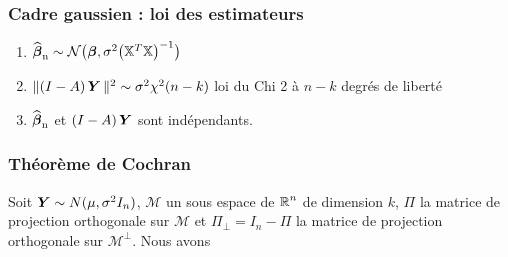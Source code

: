 
\begin{frame}
\frametitle{Cadre gaussien : loi des estimateurs}
\begin{prop}
\begin{enumerate}
\item  $\operatorname{\widehat{\boldsymbol{\beta}}_n} \sim {\mathcal N}\big(\boldsymbol{\beta}, \sigma^2 \big(\mathbb{X}^T\mathbb{X}\big)^{-1}\big)$
\item  $\|(I - A) \operatorname{\boldsymbol{Y}} \|^2 \sim
\sigma^2\chi^2(n-k)$ \alert{ loi du Chi 2 à $n-k$ degrés de liberté}
\item  $\operatorname{\widehat{\boldsymbol{\beta}}_n}$ et $(I - A) \operatorname{\boldsymbol{Y}}$ sont indépendants.
\end{enumerate}
\end{prop}
\end{frame}

\begin{frame}
\frametitle{Théorème de Cochran}
\begin{theo}
Soit $\operatorname{\boldsymbol{Y}} \sim N(\mu,\sigma^2 I_n)$, $\mathcal{M}$ un sous espace de $\operatorname{{\mathbb R}}^n$ de dimension $k$, $\Pi$ la matrice de projection orthogonale 
sur $\mathcal{M}$ et $\Pi_{\perp}= I_n - \Pi$ la matrice de projection orthogonale sur $\mathcal{M}^\perp$. Nous avons
\end{theo}
\end{frame}

